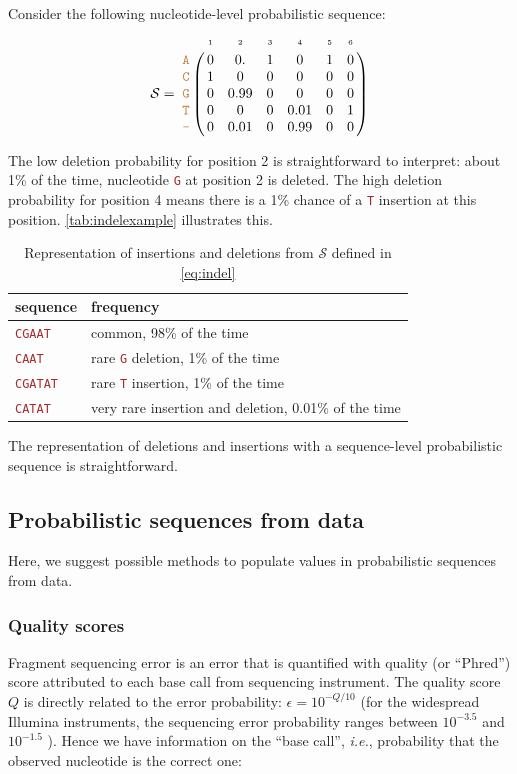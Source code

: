 \documentclass[10pt]{article}
\newcommand{\sq}[1]{\texttt{\textcolor{brown}{#1}}}
\newcommand{\ie}{\textit{i.e.},\xspace}
\newcommand{\nps}{\mathcal{S}} %
\newcommand{\nlps}{nucleotide-level probabilistic sequence\xspace}
\newcommand{\slps}{sequence-level probabilistic sequence\xspace}
\begin{document}
Consider the following \nlps:
\begin{equation}
\label{eq:indel}
\nps = 
\bordermatrix{
&\scriptscriptstyle{1} & \scriptscriptstyle{2}& \scriptscriptstyle{3}& \scriptscriptstyle{4} & \scriptscriptstyle{5} & \scriptscriptstyle{6} \cr
\sq{A} & 0 & 0.   & 1 & 0    & 1 & 0\cr
\sq{C} & 1 & 0    & 0 & 0    & 0 & 0\cr
\sq{G} & 0 & 0.99 & 0 & 0    & 0 & 0\cr
\sq{T} & 0 & 0    & 0 & 0.01 & 0 & 1\cr
\sq{-} & 0 & 0.01 & 0 & 0.99 & 0 & 0\cr
}
\end{equation}

The low deletion probability for position 2 is straightforward to interpret: about 1\% of the time, nucleotide \sq{G} at position 2 is deleted. The high deletion probability for position 4 means there is a 1\% chance of a \sq{T} insertion at this position. \autoref{tab:indelexample} illustrates this. 
\begin{table}[H]
\caption{Representation of insertions and deletions from $\nps$ defined in \eqref{eq:indel}}
\begin{center}
\label{tab:indelexample}
\begin{tabular}{ll}
\hline
\textbf{sequence} & \textbf{frequency} \\
\hline
\sq{CGAAT}  & common, 98\% of the time \\
\sq{CAAT}   & rare \sq{G} deletion, 1\% of the time \\
\sq{CGATAT} & rare \sq{T} insertion, 1\% of the time \\
\sq{CATAT} & very rare insertion and deletion, 0.01\% of the time \\
\hline
\end{tabular}
\end{center}
\end{table}

The representation of deletions and insertions with a \slps is straightforward.


\subsection{Probabilistic sequences from data}

Here, we suggest possible methods to populate values in probabilistic sequences from data. 

\subsubsection{Quality scores}
Fragment sequencing error is an error that is quantified with quality (or ``Phred'') score attributed to each base call from sequencing instrument. 
The quality score $Q$ is directly related to the error probability: $\epsilon = 10^{-Q/10}$ \cite{xxx} (for the widespread Illumina instruments, the sequencing error probability ranges between $10^{-3.5}$ and  $10^{-1.5}$ \cite{xxx}).  
Hence we have information on the ``base call'', \ie probability that the observed nucleotide is the correct one: 
\end{document}
